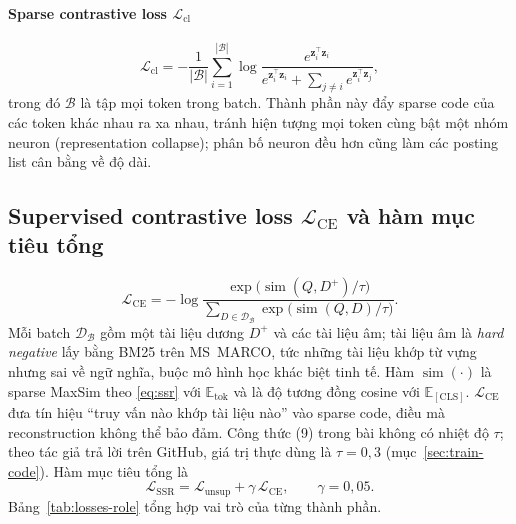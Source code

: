 \documentclass[a4paper,13pt]{extreport}
\theoremstyle{plain}
\newcommand{\bz}{\mathbf{z}}
\DeclareMathOperator{\simscore}{sim}
\begin{document}
\paragraph{Sparse contrastive loss $\mathcal{L}_{\mathrm{cl}}$}
\begin{equation}
\mathcal{L}_{\mathrm{cl}}=-\frac{1}{|\mathcal{B}|}\sum_{i=1}^{|\mathcal{B}|}\log\frac{e^{\bz_i^\top\bz_i}}{e^{\bz_i^\top\bz_i}+\sum_{j\ne i}e^{\bz_i^\top\bz_j}},
\label{eq:cl}
\end{equation}
trong đó $\mathcal{B}$ là tập mọi token trong batch. Thành phần này đẩy sparse code của các token khác nhau ra xa nhau, tránh hiện tượng mọi token cùng bật một nhóm neuron (representation collapse); phân bố neuron đều hơn cũng làm các posting list cân bằng về độ dài.

\subsection{Supervised contrastive loss $\mathcal{L}_{\mathrm{CE}}$ và hàm mục tiêu tổng}
\begin{equation}
\mathcal{L}_{\mathrm{CE}}=-\log\frac{\exp\big(\simscore(Q,D^+)/\tau\big)}{\sum_{D\in\mathcal{D}_{\mathcal{B}}}\exp\big(\simscore(Q,D)/\tau\big)} .
\label{eq:ce}
\end{equation}
Mỗi batch $\mathcal{D}_{\mathcal{B}}$ gồm một tài liệu dương $D^+$ và các tài liệu âm; tài liệu âm là \emph{hard negative} lấy bằng BM25 trên MS~MARCO, tức những tài liệu khớp từ vựng nhưng sai về ngữ nghĩa, buộc mô hình học khác biệt tinh tế. Hàm $\simscore(\cdot)$ là sparse MaxSim theo \eqref{eq:ssr} với $\mathbb{E}_{\mathrm{tok}}$ và là độ tương đồng cosine với $\mathbb{E}_{[\mathrm{CLS}]}$. $\mathcal{L}_{\mathrm{CE}}$ đưa tín hiệu ``truy vấn nào khớp tài liệu nào'' vào sparse code, điều mà reconstruction không thể bảo đảm. Công thức (9) trong bài không có nhiệt độ $\tau$; theo tác giả trả lời trên GitHub, giá trị thực dùng là $\tau=0{,}3$ (mục~\ref{sec:train-code}). Hàm mục tiêu tổng là
\begin{equation}
\mathcal{L}_{\mathrm{SSR}}=\mathcal{L}_{\mathrm{unsup}}+\gamma\,\mathcal{L}_{\mathrm{CE}},\qquad \gamma=0{,}05 .
\label{eq:total}
\end{equation}
Bảng~\ref{tab:losses-role} tổng hợp vai trò của từng thành phần.
\end{document}
